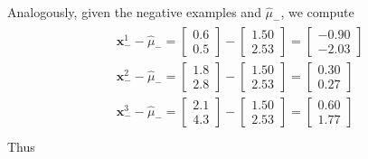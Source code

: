 \documentclass[leqno]{article}
\begin{document}
\noindent Analogously, given the negative examples and $\hat{\mu}_-$, we compute
\begin{gather*}
\begin{split}
&\textbf{x}_-^1 - \hat{\mu}_- = 
\begin{bmatrix}
   0.6\\
   0.5 
\end{bmatrix} - 
\begin{bmatrix}
   1.50\\
   2.53 
\end{bmatrix} = 
\begin{bmatrix}
   -0.90\\
   -2.03 
\end{bmatrix}\\
&\textbf{x}_-^2 - \hat{\mu}_- = 
\begin{bmatrix}
   1.8\\
   2.8 
\end{bmatrix} - 
\begin{bmatrix}
   1.50\\
   2.53 
\end{bmatrix} = 
\begin{bmatrix}
   0.30\\
   0.27 
\end{bmatrix}\\
&\textbf{x}_-^3 - \hat{\mu}_- = 
\begin{bmatrix}
   2.1\\
   4.3 
\end{bmatrix} - 
\begin{bmatrix}
   1.50\\
   2.53 
\end{bmatrix} = 
\begin{bmatrix}
   0.60\\
   1.77 
\end{bmatrix}\\
\end{split}
\end{gather*}
Thus
\end{document}
